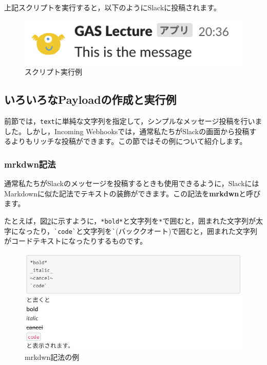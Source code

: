 \documentclass[uplatex,a4j]{jsarticle}
\begin{document}
上記スクリプトを実行すると，以下のようにSlackに投稿されます。

\begin{figure}[H]
 \centering
 \includegraphics[keepaspectratio, scale=1.0]{images/standalone_gas3.png}
 \caption{スクリプト実行例}
 \label{fig:standalone_gas3}
\end{figure}


\subsection{いろいろなPayloadの作成と実行例}


前節では，\verb|text|に単純な文字列を指定して，シンプルなメッセージ投稿を行いました。しかし，Incoming Webhooksでは，通常私たちがSlackの画面から投稿するよりもリッチな投稿ができます。この節ではその例について紹介します。

\subsubsection{mrkdwn記法}


通常私たちがSlackのメッセージを投稿するときも使用できるように，SlackにはMarkdownに似た記法でテキストの装飾ができます。この記法を\textbf{mrkdwn}と呼びます。


たとえば，図\ref{fig:mrkdwn_sample}に示すように，\verb|*bold*|と文字列を\verb|*|で囲むと，囲まれた文字列が太字になったり，\verb|`code`|と文字列を\verb|`|(バッククオート)で囲むと，囲まれた文字列がコードテキストになったりするものです。

\begin{figure}[H]
 \centering
 \includegraphics[keepaspectratio, scale=0.8]{images/mrkdwn_sample.png}
 \caption{mrkdwn記法の例}
 \label{fig:mrkdwn_sample}
\end{figure}
\end{document}
